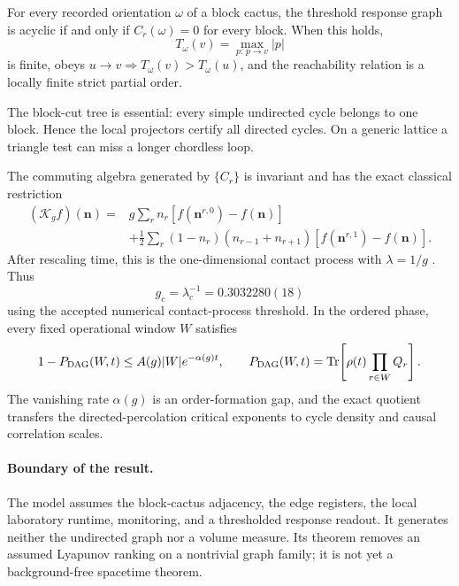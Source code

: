 \begin{theorem}
\label{thm:loop-causal-order}
For every recorded orientation \(\omega\) of a block cactus, the threshold
response graph is acyclic if and only if \(C_r(\omega)=0\) for every block.
When this holds,
\begin{equation}
 T_\omega(v)=\max_{p:\,p\to v}|p|
 \label{eq:loop-longest-path}
\end{equation}
is finite, obeys \(u\to v\Rightarrow T_\omega(v)>T_\omega(u)\), and the
reachability relation is a locally finite strict partial order.
\end{theorem}

The block-cut tree is essential: every simple undirected cycle belongs to one
block.  Hence the local projectors certify all directed cycles.  On a generic
lattice a triangle test can miss a longer chordless loop.

The commuting algebra generated by \(\{C_r\}\) is invariant and has the exact
classical restriction
\begin{align}
 (\mathcal K_gf)(\boldsymbol n)
 ={}&g\sum_r n_r
 [f(\boldsymbol n^{r,0})-f(\boldsymbol n)]\nonumber\\
 &+\frac12\sum_r(1-n_r)(n_{r-1}+n_{r+1})
 [f(\boldsymbol n^{r,1})-f(\boldsymbol n)] .
 \label{eq:loop-contact-generator}
\end{align}
After rescaling time, this is the one-dimensional contact process with
\(\lambda=1/g\) \cite{Harris1974,Liggett1999}.  Thus
\begin{equation}
 g_c=\lambda_c^{-1}=0.3032280(18)
 \label{eq:loop-causal-gc}
\end{equation}
using the accepted numerical contact-process threshold.  In the ordered
phase, every fixed operational window \(W\) satisfies
\begin{equation}
 1-P_{\rm DAG}(W,t)
 \le A(g)|W|e^{-\alpha(g)t},
 \qquad
 P_{\rm DAG}(W,t)=
 \operatorname{Tr}\!\left[\rho(t)\prod_{r\in W}Q_r\right].
 \label{eq:loop-causal-window}
\end{equation}
The vanishing rate \(\alpha(g)\) is an order-formation gap, and the exact
quotient transfers the directed-percolation critical exponents to cycle
density and causal correlation scales.

\paragraph{Boundary of the result.}
The model assumes the block-cactus adjacency, the edge registers, the local
laboratory runtime, monitoring, and a thresholded response readout.  It
generates neither the undirected graph nor a volume measure.  Its theorem
removes an assumed Lyapunov ranking on a nontrivial graph family; it is not
yet a background-free spacetime theorem.

